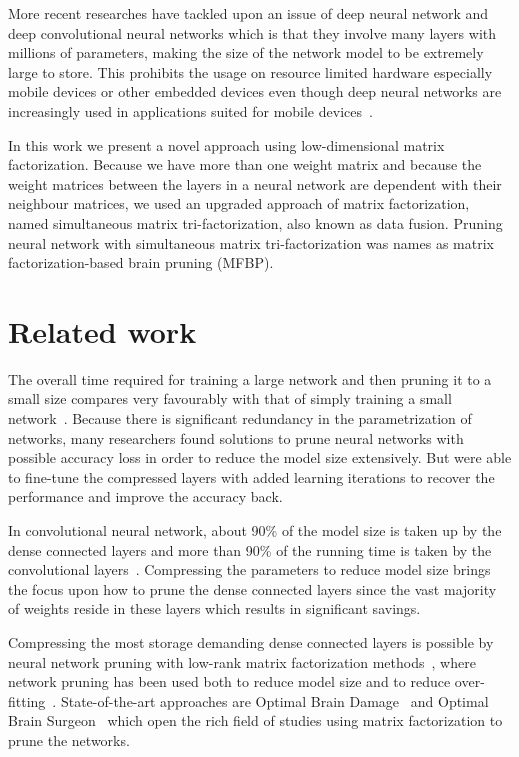\documentclass{article} %
\begin{document}
More recent researches have tackled upon an issue of deep neural network and
deep convolutional neural networks which is that they involve many layers with
millions of parameters, making the size of the network model to be extremely
large to store. This prohibits the usage on resource limited hardware
especially mobile devices or other embedded devices even though deep neural
networks are increasingly used in applications suited for mobile
devices~\cite{DBLP:journals/corr/GongLYB14}.

In this work we present a novel approach using low-dimensional matrix
factorization. Because we have more than one weight matrix and because the
weight matrices between the layers in a neural network are dependent with their
neighbour matrices, we used an upgraded approach of matrix factorization, named
simultaneous matrix tri-factorization, also known as data fusion. Pruning
neural network with simultaneous matrix tri-factorization was names as matrix
factorization-based brain pruning (MFBP).


\section{Related work}

The overall time
required for training a large network and then pruning it to a small size
compares very favourably with that of simply training a small 
network~\cite{augasta2013pruning}. Because there is significant redundancy 
in the parametrization of networks,
many researchers found solutions to prune neural networks with possible
accuracy loss in order to reduce the model size extensively. But were able to
fine-tune the compressed layers with added learning iterations to recover the
performance and improve the accuracy back.

In convolutional neural network, about 90\% 
of the model size is taken up by the dense connected layers and more than 90\% 
of the running time is taken by the convolutional 
layers~\cite{zeiler2014visualizing}. 
Compressing the parameters to reduce model size brings the focus upon how to
prune the dense connected layers since the vast majority of weights reside in
these layers which results in significant savings.

Compressing the most storage demanding dense connected layers is possible by
neural network pruning with low-rank matrix factorization
methods~\cite{bondarenko2014artificial, schmidhuber2015deep, sainath2013low},
where network pruning has been used both to reduce model size and to reduce
over-fitting~\cite{han2015learning}. State-of-the-art approaches are Optimal
Brain Damage~\cite{lecun1989optimal} and Optimal Brain
Surgeon~\cite{hassibi1993optimal} which open the rich field of studies using
matrix factorization to prune the networks.
\end{document}
